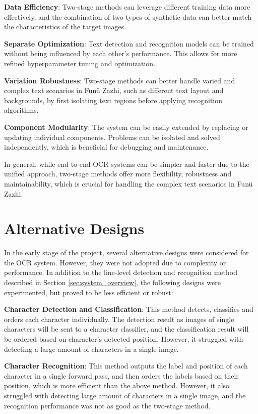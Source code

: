 \documentclass[12pt,twoside]{report}
\begin{document}
\textbf{Data Efficiency}: Two-stage methods can leverage different training data more effectively, and the combination of two types of synthetic data can better match the characteristics of the target images.

\textbf{Separate Optimization}: Text detection and recognition models can be trained without being influenced by each other's performance. This allows for more refined hyperparameter tuning and optimization.

\textbf{Variation Robustness}: Two-stage methods can better handle varied and complex text scenarios in Funü Zazhi, such as different text layout and backgrounds, by first isolating text regions before applying recognition algorithms.

\textbf{Component Modularity}: The system can be easily extended by replacing or updating individual components. Problems can be isolated and solved independently, which is beneficial for debugging and maintenance.

In general, while end-to-end OCR systems can be simpler and faster due to the unified approach, two-stage methods offer more flexibility, robustness and maintainability, which is crucial for handling the complex text scenarios in Funü Zazhi.

\section{Alternative Designs}
\label{sec:alternative_designs}
In the early stage of the project, several alternative designs were considered for the OCR system. However, they were not adopted due to complexity or performance. In addition to the line-level detection and recognition method described in Section \ref{sec:system_overview}, the following designs were experimented, but proved to be less efficient or robust:

\textbf{Character Detection and Classification}: This method detects, classifies and orders each character individually. The detection result as images of single characters will be sent to a character classifier, and the classification result will be ordered based on character's detected position. However, it struggled with detecting a large amount of characters in a single image.

\textbf{Character Recognition}: This method outputs the label and position of each character in a single forward pass, and then orders the labels based on their position, which is more efficient than the above method. However, it also struggled with detecting large amount of characters in a single image, and the recognition performance was not as good as the two-stage method.
\end{document}
